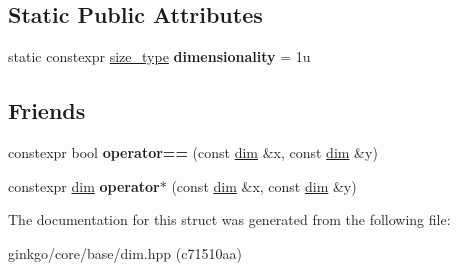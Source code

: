 \subsection*{Static Public Attributes}
\begin{DoxyCompactItemize}
\item 
\mbox{\label{structgko_1_1dim_3_011u_00_01DimensionType_01_4_af991219c5c0f3b362f205a239767f3a3}} 
static constexpr \hyperlink{namespacegko_a6e5c95df0ae4e47aab2f604a22d98ee7}{size\+\_\+type} {\bfseries dimensionality} = 1u
\end{DoxyCompactItemize}
\subsection*{Friends}
\begin{DoxyCompactItemize}
\item 
\mbox{\label{structgko_1_1dim_3_011u_00_01DimensionType_01_4_a5e2c1e99f1c12540aac8489127c5dfb6}} 
constexpr bool {\bfseries operator==} (const \hyperlink{structgko_1_1dim}{dim} \&x, const \hyperlink{structgko_1_1dim}{dim} \&y)
\item 
\mbox{\label{structgko_1_1dim_3_011u_00_01DimensionType_01_4_a27d25e410396817b4ceafbae3d5df5c8}} 
constexpr \hyperlink{structgko_1_1dim}{dim} {\bfseries operator$\ast$} (const \hyperlink{structgko_1_1dim}{dim} \&x, const \hyperlink{structgko_1_1dim}{dim} \&y)
\end{DoxyCompactItemize}


The documentation for this struct was generated from the following file\+:\begin{DoxyCompactItemize}
\item 
ginkgo/core/base/dim.\+hpp (c71510aa)\end{DoxyCompactItemize}
